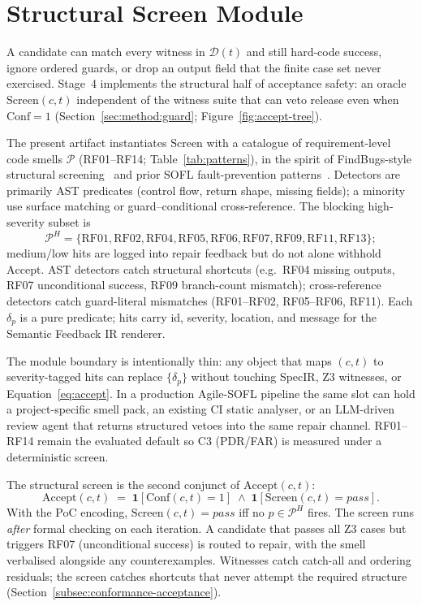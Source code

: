 \section{Structural Screen Module}
\label{sec:impl:patterns}

A candidate can match every witness in $\mathcal{D}(t)$ and still hard-code
success, ignore ordered guards, or drop an output field that the finite case
set never exercised.
Stage~4 implements the structural half of acceptance safety: an
oracle $\mathrm{Screen}(c,t)$ independent of the witness suite that can veto
release even when $\mathrm{Conf}{=}1$
(Section~\ref{sec:method:guard}; Figure~\ref{fig:accept-tree}).

The present artifact instantiates $\mathrm{Screen}$ with a catalogue of
requirement-level code smells $\mathcal{P}$ (RF01--RF14;
Table~\ref{tab:patterns}), in the spirit of FindBugs-style structural
screening~\citep{hovemeyer2004findbugs,ayewah2007findbugs} and prior SOFL
fault-prevention patterns~\citep{li2023iet_faultprevention}.
Detectors are primarily AST predicates (control flow, return shape, missing
fields); a minority use surface matching or guard--conditional
cross-reference.
The blocking high-severity subset is
\[
  \mathcal{P}^H = \{\text{RF01}, \text{RF02}, \text{RF04}, \text{RF05},
    \text{RF06}, \text{RF07}, \text{RF09}, \text{RF11}, \text{RF13}\};
\]
medium/low hits are logged into repair feedback but do not alone withhold
$\mathrm{Accept}$.
AST detectors catch structural shortcuts (e.g.\ RF04 missing outputs, RF07
unconditional success, RF09 branch-count mismatch); cross-reference
detectors catch guard-literal mismatches (RF01--RF02, RF05--RF06, RF11).
Each $\delta_p$ is a pure predicate; hits carry id, severity, location, and
message for the Semantic Feedback IR renderer.

The module boundary is intentionally thin: any object that maps $(c,t)$ to
severity-tagged hits can replace $\{\delta_p\}$ without touching SpecIR, Z3
witnesses, or Equation~\eqref{eq:accept}.
In a production Agile-SOFL pipeline the same slot can hold a project-specific
smell pack, an existing CI static analyser, or an LLM-driven review agent that
returns structured vetoes into the same repair channel.
RF01--RF14 remain the evaluated default so C3 (PDR/FAR) is measured under a
deterministic screen.

The structural screen is the second conjunct of $\mathrm{Accept}(c,t)$:
\[
  \mathrm{Accept}(c, t)
  \;=\;
  \mathbf{1}\!\left[\mathrm{Conf}(c, t) = 1\right]
  \;\land\;
  \mathbf{1}\!\left[\mathrm{Screen}(c, t) = \mathit{pass}\right].
\]
With the PoC encoding,
$\mathrm{Screen}(c,t)=\mathit{pass}$ iff no $p\in\mathcal{P}^H$ fires.
The screen runs \emph{after} formal checking on each iteration.
A candidate that passes all Z3 cases but triggers RF07 (unconditional
success) is routed to repair, with the smell verbalised alongside any
counterexamples.
Witnesses catch catch-all and ordering residuals; the screen catches
shortcuts that never attempt the required structure
(Section~\ref{subsec:conformance-acceptance}).

